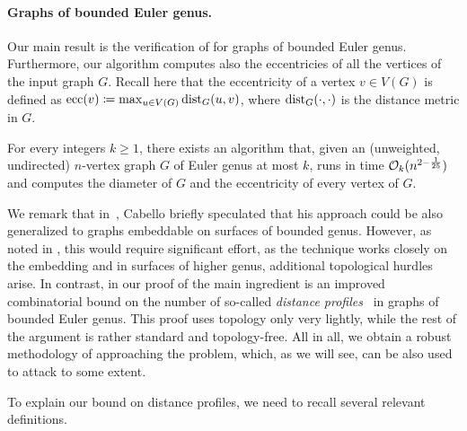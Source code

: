 \paragraph{Graphs of bounded Euler genus.}
Our main result is the verification of  for graphs
of bounded Euler genus. Furthermore, our algorithm computes also the eccentricies
of all the vertices of the input graph $G$. Recall here that
    the eccentricity of a vertex $v \in V(G)$ is defined as
    $\mathrm{ecc}(v) \coloneqq \max_{u \in V(G)} \mathrm{dist}_G(u,v)$, where $\mathrm{dist}_G(\cdot,\cdot)$ is the distance metric in $G$.
\begin{theorem}\label{thm:main-genus}
For every integers $k \geq 1$,
there exists an algorithm that, given an (unweighted, undirected) $n$-vertex graph $G$
of Euler genus at most $k$, runs in time $\mathcal{O}_k(n^{2-\frac{1}{25}})$
and computes the diameter of $G$ and the eccentricity of every vertex of $G$.
\end{theorem}

We remark that in~\cite[Section~9]{Cabello19}, Cabello briefly speculated that his approach could be also generalized to graphs embeddable on surfaces of bounded genus. However, as noted in \cite{Cabello19}, this would require significant effort, as the technique works closely on the embedding and in surfaces of higher genus, additional topological hurdles arise. In contrast, in our proof of  the main ingredient is an improved combinatorial bound on the number of so-called \emph{distance profiles}~\cite{LeW24} in graphs of bounded Euler genus. This proof uses topology only very lightly, while the rest of the argument is rather standard and topology-free. All in all, we obtain a robust methodology of approaching the problem, which, as we will see, can be also used to attack  to some extent.

To explain our bound on distance profiles, we need to recall several relevant definitions.

